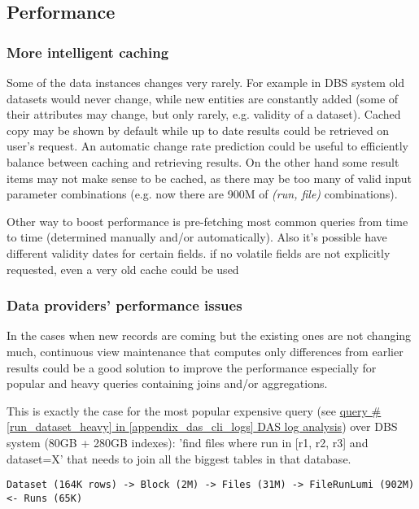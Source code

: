 \subsection{Performance}



\subsubsection*{More intelligent caching}
Some of the data instances changes very rarely. For example in DBS system old datasets would never change, while new entities are constantly added (some of their attributes may change, but only rarely, e.g.  validity of a dataset). 
%
Cached copy may be shown by default while up to date results could be retrieved on user's request. An automatic change rate prediction could be useful to efficiently balance between caching and retrieving results.
%
On the other hand some result items may not make sense to be cached, as there may be too many of valid input parameter combinations (e.g. now there are 900M of \textit{(run, file)} combinations).

Other way to boost performance is pre-fetching most common queries from time to time (determined manually and/or automatically). Also it's possible have different validity dates for certain fields. if no volatile fields are not explicitly requested, even a very old cache could be used

\subsubsection*{Data providers' performance issues}
In the cases when new records are coming but the existing ones are not changing much, continuous view maintenance that computes only differences from earlier results could be a good solution to improve the performance especially for popular and heavy queries containing joins and/or aggregations. 

This is exactly the case for the most popular expensive query (see \hyperref[run_dataset_heavy]{query \#\ref{run_dataset_heavy} in \ref{appendix_das_cli_logs} DAS log analysis}) over DBS system (80GB + 280GB indexes): 'find files where run in [r1, r2, r3] and dataset=X' that needs to join all the biggest tables in that database.

\begin{verbatim}
Dataset (164K rows) -> Block (2M) -> Files (31M) -> FileRunLumi (902M) <- Runs (65K)
\end{verbatim}

